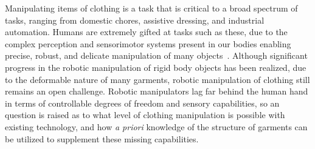 \documentclass[letterpaper, 10 pt, conference]{ieeeconf}  %
\begin{document}


Manipulating items of clothing is a task that is critical to a broad spectrum of tasks, ranging from domestic chores, assistive dressing, and industrial automation.
%
Humans are extremely gifted at tasks such as these, due to the complex perception and sensorimotor systems present in our bodies enabling precise, robust, and delicate manipulation of many objects~\cite{sobinov2021neural}.
Although significant progress in the robotic manipulation of rigid body objects has been realized, due to the deformable nature of many garments, robotic manipulation of clothing still remains an open challenge.
%
Robotic manipulators lag far behind the human hand in terms of controllable degrees of freedom and sensory capabilities, so an question is raised as to what level of clothing manipulation is possible with existing technology, and how \textit{a priori} knowledge of the structure of garments can be utilized to supplement these missing capabilities.
%
\end{document}
